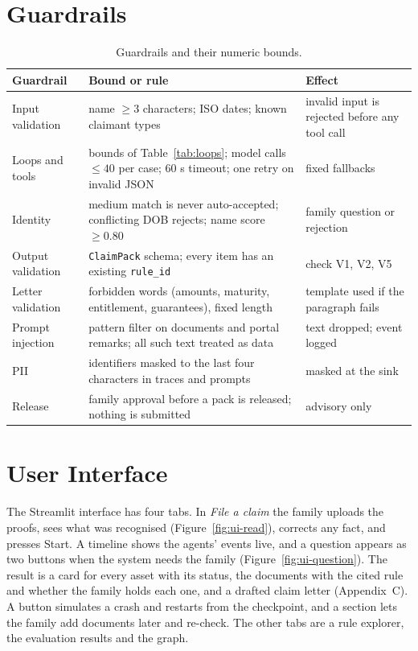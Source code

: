 \documentclass[12pt,a4paper,oneside]{report}
\begin{document}
\section{Guardrails}\label{sec:guard}
\begin{table}[H]
\centering\footnotesize{}
\caption{Guardrails and their numeric bounds.}\label{tab:guard}
\renewcommand{\arraystretch}{1.1}
\begin{tabularx}{\linewidth}{@{}p{3.3cm}p{3.5cm}X@{}}
\toprule
\textbf{Guardrail} & \textbf{Bound or rule} & \textbf{Effect} \\ \midrule
Input validation & name $\ge 3$ characters; ISO dates; known claimant types & invalid input is rejected before any tool call \\
Loops and tools & bounds of Table~\ref{tab:loops}; model calls $\le 40$ per case; 60 s timeout; one retry on invalid JSON & fixed fallbacks \\
Identity & medium match is never auto-accepted; conflicting DOB rejects; name score $\ge 0.80$ & family question or rejection \\
Output validation & \texttt{ClaimPack} schema; every item has an existing \texttt{rule\_id} & check V1, V2, V5 \\
Letter validation & forbidden words (amounts, maturity, entitlement, guarantees), fixed length & template used if the paragraph fails \\
Prompt injection & pattern filter on documents and portal remarks; all such text treated as data & text dropped; event logged \\
PII & identifiers masked to the last four characters in traces and prompts & masked at the sink \\
Release & family approval before a pack is released; nothing is submitted & advisory only \\ \bottomrule
\end{tabularx}
\end{table}

\section{User Interface}\label{sec:ui}
The Streamlit interface has four tabs. In \emph{File a claim} the family uploads the proofs, sees what was recognised (Figure~\ref{fig:ui-read}), corrects any fact, and presses Start. A timeline shows the agents' events live, and a question appears as two buttons when the system needs the family (Figure~\ref{fig:ui-question}). The result is a card for every asset with its status, the documents with the cited rule and whether the family holds each one, and a drafted claim letter (Appendix~C). A button simulates a crash and restarts from the checkpoint, and a section lets the family add documents later and re-check. The other tabs are a rule explorer, the evaluation results and the graph.
\end{document}
